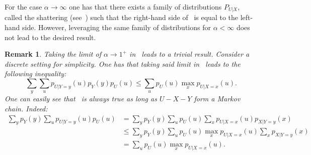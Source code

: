 \documentclass{article}
\numberwithin{theorem}{section}
\numberwithin{example}{section}
\newtheorem{remark}{Remark}
\numberwithin{remark}{section}
\numberwithin{definition}{section}
\newcommand{\X}{\mathcal{X}}
\begin{document}
For the case $\alpha\to\infty$ one has that there exists a family of distributions $P_{U|X}$, called the shattering (see~\cite[Equation (13)]{MaximalLeakage:20}) such that the right-hand side of~ is equal to the left-hand side. However, leveraging the same family of distributions for $\alpha<\infty$ does not lead to the desired result. \fi %
\begin{remark}
Taking the limit of $\alpha\to1^+$ in~ leads to a trivial result. Consider a discrete setting for simplicity. One has that taking said limit in~ leads to the following inequality:
\begin{equation}
\sum_y \sum_u p_{U|Y=y}(u) p_Y(y) p_{U}(u) \leq \sum_u p_U(u) \max_x p_{U|X=x}(u). \label{eq:trivialAlphaTo1}
\end{equation}
One can easily see that~ is always true as long as $U-X-Y$ form a Markov chain. Indeed:
\begin{align}
\sum_y p_Y(y) \sum_u p_{U|Y=y}(u)  p_{U}(u)    &= \sum_y p_Y(y) \sum_u p_{U}(u) \sum_x p_{U|X=x}(u) p_{X|Y=y}(x) \\
&\leq \sum_y p_Y(y) \sum_u p_{U}(u) \max_x p_{U|X=x}(u) \sum_x  p_{X|Y=y}(x) \\
&= \sum_u p_U(u) \max_x p_{U|X=x}(u).
\end{align}
\end{remark}
\end{document}
